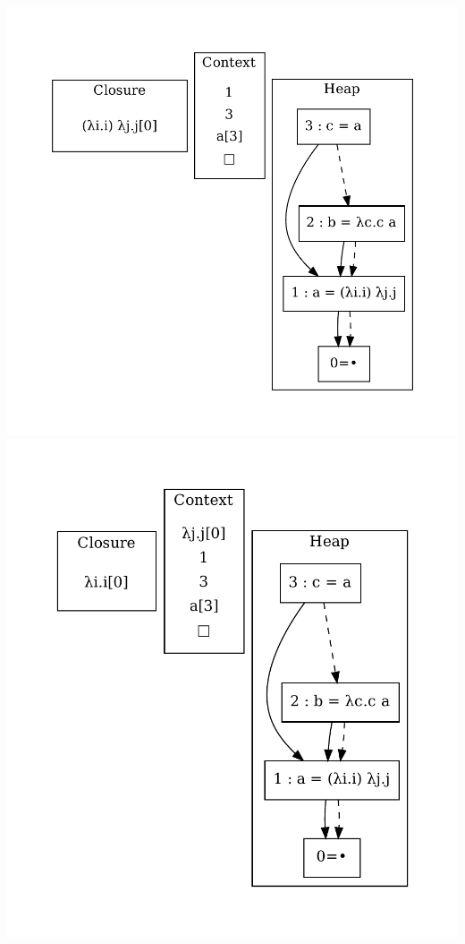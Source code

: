 \includegraphics[width=\linewidth/2]{figures/12.pdf}
\includegraphics[width=\linewidth/2]{figures/13.pdf}
